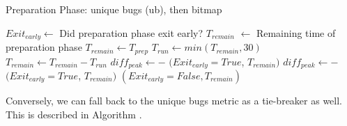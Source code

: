 \begin{algorithm}[h!]
  \caption{Preparation Phase: unique bugs (ub), then bitmap}\label{prep-phase-with-ub-bitmap}
  \small
  \begin{algorithmic}[1]
    \Output
      \State $Exit_{early} \gets$ Did preparation phase exit early?
      \State $T_{remain}$ $\gets$ Remaining time of preparation phase
    \EndOutput
      \State $T_{remain} \gets T_{prep}$
        \State $T_{run} \gets min(T_{remain},30)$
            \State {}
          \EndFor
        \Else {}
          \State {}
        \EndIf
        \State $T_{remain} \gets T_{remain} - T_{run}$
        \State $diff_{peak} \gets $$ - $
          \State \Return $(Exit_{early}=True$, $T_{remain})$
        \Else {}
          \State $diff_{peak} \gets $$ - $
              \State \Return $(Exit_{early}=True$, $T_{remain})$
          \EndIf
        \EndIf
      \EndWhile
      \State \Return $(Exit_{early}=False, T_{remain})$
    \EndFunction
  \end{algorithmic}
\end{algorithm}

Conversely, we can fall back to the unique bugs metric as a tie-breaker as well. This is described in
Algorithm .

